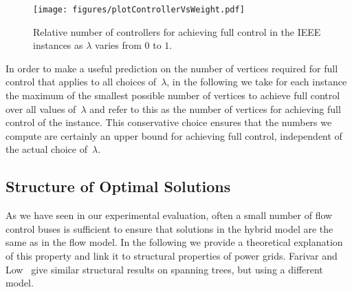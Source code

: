 \documentclass{article}[11pt,a4paper]
\newcommand{\plotscaleOne}{0.45}
\begin{document}
\begin{figure}[tb!]\centering
\texttt{[image: figures/plotControllerVsWeight.pdf]}
	\caption{Relative number of controllers for achieving full
          control in the IEEE instances as $\lambda$ varies from $0$ to
          $1$.}\label{fig:plot-controller-weight}\end{figure}

In order to make a useful prediction on the number of vertices
required for full control that applies to all choices of~$\lambda$, in
the following we take for each instance the maximum of the smallest
possible number of vertices to achieve full control over all values 
of~$\lambda$ and refer to this as the number of vertices for achieving
full control of the instance.  This conservative choice ensures that
the numbers we compute are certainly an upper bound for achieving full
control, independent of the actual choice of~$\lambda$.
\subsection{Structure of Optimal Solutions}
\label{sub:hybridtheory}
As we have seen in our experimental evaluation, often a small number
of flow control buses is sufficient to ensure that solutions in the hybrid
model are the same as in the flow model.  In the following we provide
a theoretical explanation of this property and link it to structural
properties of power grids. Farivar and Low~\cite{6507352} give similar structural 
results on spanning trees, but using a different model.
\end{document}
